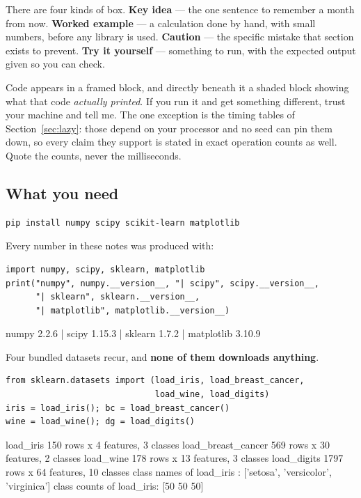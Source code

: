 \documentclass[11pt]{article}
\begin{document}
There are four kinds of box. \textbf{Key idea} --- the one sentence to
remember a month from now. \textbf{Worked example} --- a calculation done by
hand, with small numbers, before any library is used. \textbf{Caution} --- the
specific mistake that section exists to prevent. \textbf{Try it yourself} ---
something to run, with the expected output given so you can check.

Code appears in a framed block, and directly beneath it a shaded block showing
what that code \emph{actually printed}. If you run it and get something
different, trust your machine and tell me. The one exception is the timing
tables of Section~\ref{sec:lazy}: those depend on your processor and no seed
can pin them down, so every claim they support is stated in exact operation
counts as well. Quote the counts, never the milliseconds.

\subsection{What you need}

\begin{lstlisting}
pip install numpy scipy scikit-learn matplotlib
\end{lstlisting}

Every number in these notes was produced with:

\begin{lstlisting}
import numpy, scipy, sklearn, matplotlib
print("numpy", numpy.__version__, "| scipy", scipy.__version__,
      "| sklearn", sklearn.__version__,
      "| matplotlib", matplotlib.__version__)
\end{lstlisting}
\begin{codeout}
numpy 2.2.6 | scipy 1.15.3 | sklearn 1.7.2 | matplotlib 3.10.9
\end{codeout}

Four bundled datasets recur, and \textbf{none of them downloads anything}.

\begin{lstlisting}
from sklearn.datasets import (load_iris, load_breast_cancer,
                              load_wine, load_digits)
iris = load_iris(); bc = load_breast_cancer()
wine = load_wine(); dg = load_digits()
\end{lstlisting}
\begin{codeout}
load_iris             150 rows x  4 features, 3 classes
load_breast_cancer    569 rows x 30 features, 2 classes
load_wine             178 rows x 13 features, 3 classes
load_digits          1797 rows x 64 features, 10 classes
class names of load_iris : ['setosa', 'versicolor', 'virginica']
class counts of load_iris: [50 50 50]
\end{codeout}
\end{document}
